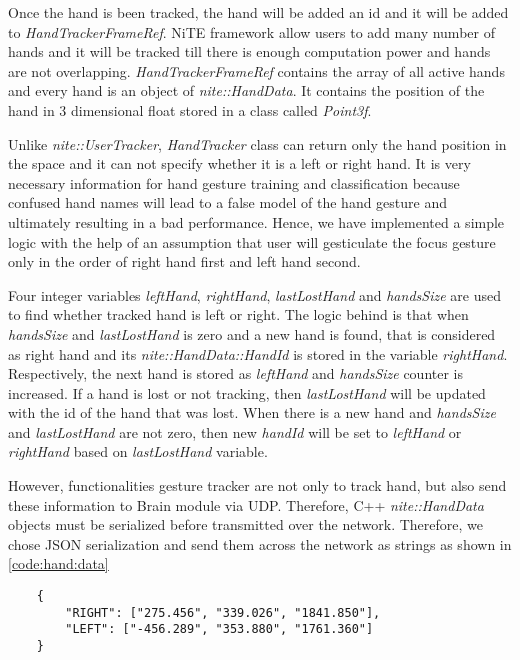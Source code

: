 Once the hand is been tracked, the hand will be added an id and it will be added to \textit{HandTrackerFrameRef}. NiTE framework allow users to add many number of hands and it will be tracked till there is enough computation power and hands are not overlapping. \textit{HandTrackerFrameRef} contains the array of all active hands and every hand is an object of \textit{nite::HandData}. It contains the position of the hand in 3 dimensional float stored in a class called \textit{Point3f}.

Unlike \textit{nite::UserTracker}, \textit{HandTracker} class can return only the hand position in the space and it can not specify whether it is a left or right hand. It is very necessary information for hand gesture training and classification because confused hand names will lead to a false model of the hand gesture and ultimately resulting in a bad performance. Hence, we have implemented a simple logic with the help of an assumption that user will gesticulate the focus gesture only in the order of right hand first and left hand second. 

Four integer variables \textit{leftHand}, \textit{rightHand}, \textit{lastLostHand} and \textit{handsSize} are used to find whether tracked hand is left or right. The logic behind is that when \textit{handsSize} and \textit{lastLostHand} is zero and a new hand is found, that is considered as right hand and its \textit{nite::HandData::HandId} is stored in the variable \textit{rightHand}. Respectively, the next hand is stored as \textit{leftHand} and \textit{handsSize} counter is increased. If a hand is lost or not tracking, then \textit{lastLostHand} will be updated with the id of the hand that was lost. When there is a new hand and \textit{handsSize} and \textit{lastLostHand} are not zero, then new \textit{handId} will be set to \textit{leftHand} or \textit{rightHand} based on \textit{lastLostHand} variable.

However, functionalities gesture tracker are not only  to track hand, but also send these information to Brain module via UDP. Therefore, C++  \textit{nite::HandData} objects must be serialized before transmitted over the network. Therefore, we chose JSON serialization and send them across the network as strings as shown in \ref{code:hand:data}

\begin{lstlisting}
	{
		"RIGHT": ["275.456", "339.026", "1841.850"], 
		"LEFT": ["-456.289", "353.880", "1761.360"]
	}
\end{lstlisting}
\label{code:hand:data}

